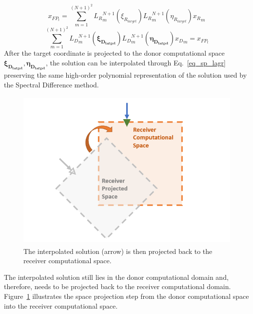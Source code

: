 %
\begin{equation}
    \label{eq_ho_quad_1}
   x_{FP_t} = \sum_{m=1}^{(N+1)^{2}}{{L_{R}}^{N+1}_m(\xi_{R_{target}}) {L_{R}}^{N+1}_m(\eta_{R_{target}}) {x_R}_{m}}
\end{equation}
%
\begin{equation}
    \label{eq_ho_quad_2}
  \sum_{m=1}^{(N+1)^{2}}{{L_{D}}^{N+1}_m(\mathbf{\xi_{D_{target}}}) {L_{D}}^{N+1}_m(\mathbf{\eta_{D_{target}}}) {x_D}_{m}} = x_{FP_t}
\end{equation}
%
After the target coordinate is projected to the donor computational space $\mathbf{\xi_{D_{target}}}, \mathbf{\eta_{D_{target}}}$, the solution can be interpolated through Eq.\ \ref{eq_sp_lagr} preserving the same high-order polynomial representation of the solution used by the Spectral Difference method. 
%
\begin{figure}[H]
	\centering
	\includegraphics[height=8.0cm]{figs/overset/space_transformation_p3.png}
    \caption{The interpolated solution (arrow) is then projected back to the receiver computational space.}
    \label{fig:space_transform_p3}
\end{figure}

The interpolated solution still lies in the donor computational domain and, therefore, needs to be projected back to the receiver computational domain.  Figure\ \ref{fig:space_transform_p3} illustrates the space projection step from the donor computational space into the receiver computational space. 

